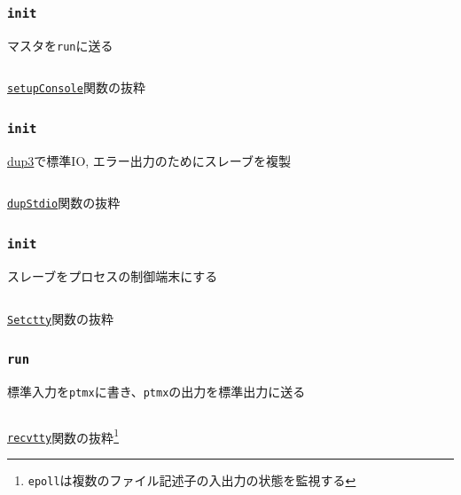 \documentclass[unicode, 14pt, aspectratio=169]{beamer}
\begin{document}
\begin{frame}
  \frametitle{\texttt{init}}
  マスタを\texttt{run}に送る
  \begin{center}
    \inputminted{go}{code/tty_init.go}
    \href{https://github.com/opencontainers/runc/blob/7cb363254b69e10320360b63fb73e0ffb5da7bf2/libcontainer/init_linux.go\#L371}{\texttt{setupConsole}}関数の抜粋
  \end{center}
\end{frame}
\begin{frame}
  \frametitle{\texttt{init}}
  \href{https://ja.manpages.org/dup3/2}{dup3}で標準IO, エラー出力のためにスレーブを複製
  \begin{center}
    \inputminted{go}{code/pty_init_dup.go}
    \href{https://github.com/opencontainers/runc/blob/7cb363254b69e10320360b63fb73e0ffb5da7bf2/libcontainer/console_linux.go\#L28}{\texttt{dupStdio}}関数の抜粋
  \end{center}
\end{frame}
\begin{frame}
  \frametitle{\texttt{init}}
  スレーブをプロセスの制御端末にする\supercite{ioctl}
  \begin{center}
    \inputminted{go}{code/pty_tty.go}
    \href{https://github.com/opencontainers/runc/blob/7cb363254b69e10320360b63fb73e0ffb5da7bf2/libcontainer/system/linux.go\#L121}{\texttt{Setctty}}関数の抜粋
  \end{center}
\end{frame}
\begin{frame}
  \frametitle{\texttt{run}}
  標準入力を\texttt{ptmx}に書き、\texttt{ptmx}の出力を標準出力に送る
  \begin{center}
    \inputminted{go}{code/tty_run.go}
    \href{https://github.com/opencontainers/runc/blob/7cb363254b69e10320360b63fb73e0ffb5da7bf2/tty.go\#L102}{\texttt{recvtty}}関数の抜粋\footnote{\scriptsize{\texttt{epoll}\supercite{epoll}は複数のファイル記述子の入出力の状態を監視する}}
  \end{center}
\end{frame}
\end{document}
